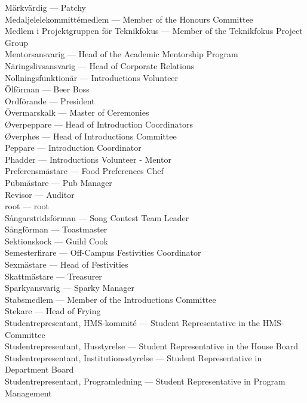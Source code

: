 \documentclass{dsekprotokoll}
\begin{document}
Märkvärdig ---	Patchy\\
Medaljelelekommittémedlem ---	Member of the Honours Committee\\
Medlem i Projektgruppen för Teknikfokus ---	Member of the Teknikfokus Project Group\\
Mentorsansvarig ---	Head of the Academic Mentorship Program\\
Näringslivsansvarig ---	Head of Corporate Relations\\
Nollningsfunktionär ---	Introductions Volunteer\\
Ölförman ---	Beer Boss\\
Ordförande ---	President\\
Övermarskalk ---	Master of Ceremonies\\
Øverpeppare ---	Head of Introduction Coordinators\\
Øverphøs ---	Head of Introductions Committee\\
Peppare ---	Introduction Coordinator\\
Phadder ---	Introductions Volunteer - Mentor\\
Preferensmästare ---	Food Preferences Chef\\
Pubmästare ---	Pub Manager\\
Revisor	 --- Auditor\\
root ---	root\\
Sångarstridsförman ---	Song Contest Team Leader\\
Sångförman ---	Toastmaster\\
Sektionskock ---	Guild Cook\\
Semesterfirare ---	Off-Campus Festivities Coordinator\\
Sexmästare ---	Head of Festivities\\
Skattmästare ---	Treasurer\\
Sparkyansvarig ---	Sparky Manager\\
Stabsmedlem ---	Member of the Introductions Committee\\
Stekare ---	Head of Frying\\
Studentrepresentant, HMS-kommité ---	Student Representative in the HMS-Committee\\
Studentrepresentant, Husstyrelse ---	Student Representative in the House Board\\
Studentrepresentant, Institutionsstyrelse ---	Student Representative in Department Board\\
Studentrepresentant, Programledning ---	Student Representative in Program Management\\
\end{document}
